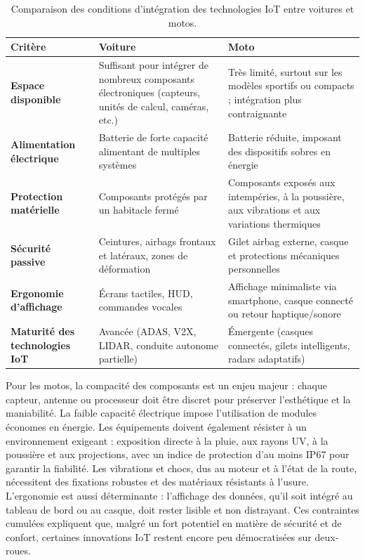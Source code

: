 \begin{table}[H]
\centering
\caption{Comparaison des conditions d’intégration des technologies IoT entre voitures et motos.}
\label{tab:comparaison_iot_voiture_moto}
\renewcommand{\arraystretch}{1.15}
\begin{tabular}{|p{3.2cm}|p{6.5cm}|p{6.5cm}|}
\hline
\textbf{Critère} & \textbf{Voiture} & \textbf{Moto} \\
\hline
\textbf{Espace disponible} &
Suffisant pour intégrer de nombreux composants électroniques (capteurs, unités de calcul, caméras, etc.) &
Très limité, surtout sur les modèles sportifs ou compacts ; intégration plus contraignante \\
\hline
\textbf{Alimentation électrique} &
Batterie de forte capacité alimentant de multiples systèmes &
Batterie réduite, imposant des dispositifs sobres en énergie \\
\hline
\textbf{Protection matérielle} &
Composants protégés par un habitacle fermé &
Composants exposés aux intempéries, à la poussière, aux vibrations et aux variations thermiques \\
\hline
\textbf{Sécurité passive} &
Ceintures, airbags frontaux et latéraux, zones de déformation &
Gilet airbag externe, casque et protections mécaniques personnelles \\
\hline
\textbf{Ergonomie d’affichage} &
Écrans tactiles, HUD, commandes vocales &
Affichage minimaliste via smartphone, casque connecté ou retour haptique/sonore \\
\hline
\textbf{Maturité des technologies IoT} &
Avancée (ADAS, V2X, LIDAR, conduite autonome partielle) &
Émergente (casques connectés, gilets intelligents, radars adaptatifs) \\
\hline
\end{tabular}
\end{table}

Pour les motos, la compacité des composants est un enjeu majeur : chaque capteur, antenne ou processeur doit être discret pour préserver l’esthétique et la maniabilité. La faible capacité électrique impose l’utilisation de modules économes en énergie. Les équipements doivent également résister à un environnement exigeant : exposition directe à la pluie, aux rayons UV, à la poussière et aux projections, avec un indice de protection d’au moins IP67 pour garantir la fiabilité.
Les vibrations et chocs, dus au moteur et à l’état de la route, nécessitent des fixations robustes et des matériaux résistants à l’usure. L’ergonomie est aussi déterminante : l’affichage des données, qu’il soit intégré au tableau de bord ou au casque, doit rester lisible et non distrayant. Ces contraintes cumulées expliquent que, malgré un fort potentiel en matière de sécurité et de confort, certaines innovations IoT restent encore peu démocratisées sur deux-roues.


